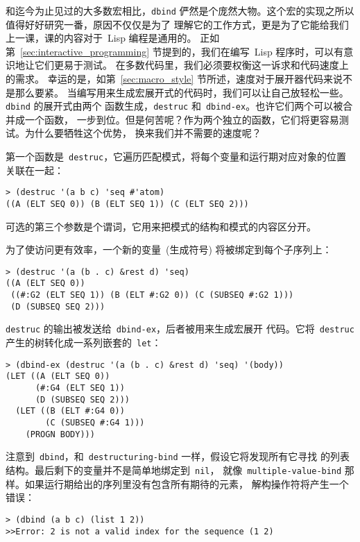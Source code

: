和迄今为止见过的大多数宏相比，\texttt{dbind} 俨然是个庞然大物。这个宏的实现之所以值得好好研究一番，原因不仅仅是为了
理解它的工作方式，更是为了它能给我们上一课，课的内容对于~Lisp 编程是通用的。
正如第~\ref{sec:interactive_programming} 节提到的，我们在编写~Lisp 程序时，可以有意识地让它们更易于测试。
在多数代码里，我们必须要权衡这一诉求和代码速度上的需求。
幸运的是，如第~\ref{sec:macro_style} 节所述，速度对于展开器代码来说不是那么要紧。
当编写用来生成宏展开式的代码时，我们可以让自己放轻松一些。\texttt{dbind} 的展开式由两个
函数生成，\texttt{destruc} 和~\texttt{dbind-ex}。也许它们两个可以被合并成一个函数，
一步到位。但是何苦呢？作为两个独立的函数，它们将更容易测试。为什么要牺牲这个优势，
换来我们并不需要的速度呢？

第一个函数是~\texttt{destruc}，它遍历匹配模式，将每个变量和运行期对应对象的位置关联在一起：
\begin{lstlisting}
> (destruc '(a b c) 'seq #'atom)
((A (ELT SEQ 0)) (B (ELT SEQ 1)) (C (ELT SEQ 2)))
\end{lstlisting}
可选的第三个参数是个谓词，它用来把模式的结构和模式的内容区分开。

为了使访问更有效率，一个新的变量~(生成符号) 将被绑定到每个子序列上：
\begin{lstlisting}
> (destruc '(a (b . c) &rest d) 'seq)
((A (ELT SEQ 0))
 ((#:G2 (ELT SEQ 1)) (B (ELT #:G2 0)) (C (SUBSEQ #:G2 1)))
 (D (SUBSEQ SEQ 2)))
\end{lstlisting}

\texttt{destruc} 的输出被发送给~\texttt{dbind-ex}，后者被用来生成宏展开
代码。它将~\texttt{destruc} 产生的树转化成一系列嵌套的~\texttt{let}：
\begin{lstlisting}
> (dbind-ex (destruc '(a (b . c) &rest d) 'seq) '(body))
(LET ((A (ELT SEQ 0))
      (#:G4 (ELT SEQ 1))
      (D (SUBSEQ SEQ 2)))
  (LET ((B (ELT #:G4 0))
        (C (SUBSEQ #:G4 1)))
    (PROGN BODY)))
\end{lstlisting}

注意到~\texttt{dbind}，和~\texttt{destructuring-bind} 一样，假设它将发现所有它寻找
的列表结构。最后剩下的变量并不是简单地绑定到~\texttt{nil}，
就像~\texttt{multiple-value-bind} 那样。如果运行期给出的序列里没有包含所有期待的元素，
解构操作符将产生一个错误：
\begin{lstlisting}
> (dbind (a b c) (list 1 2))
>>Error: 2 is not a valid index for the sequence (1 2)
\end{lstlisting}


